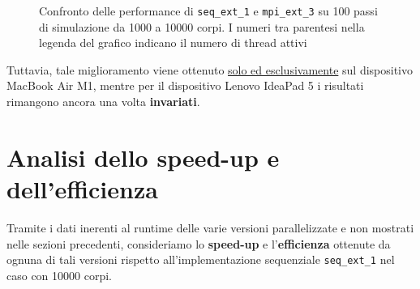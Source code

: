 \documentclass[12pt]{report}
\begin{document}
\begin{figure}[H]

        \caption{Confronto delle performance di \texttt{seq\_ext\_1} e \texttt{mpi\_ext\_3} su 100 passi di simulazione da 1000 a 10000 corpi. I numeri tra parentesi nella legenda del grafico indicano il numero di thread attivi}
        \label{fig:mpi_3_ext_graph}
    \end{figure}

    Tuttavia, tale miglioramento viene ottenuto \underline{solo ed esclusivamente} sul dispositivo MacBook Air M1, mentre per il dispositivo Lenovo IdeaPad 5 i risultati rimangono ancora una volta \textbf{invariati}.

    \newpage

    \section{Analisi dello speed-up e dell'efficienza}

    Tramite i dati inerenti al runtime delle varie versioni parallelizzate e non mostrati nelle sezioni precedenti, consideriamo lo \textbf{speed-up} e l'\textbf{efficienza} ottenute da ognuna di tali versioni rispetto all'implementazione sequenziale \texttt{seq\_ext\_1} nel caso con 10000 corpi.
\end{document}
